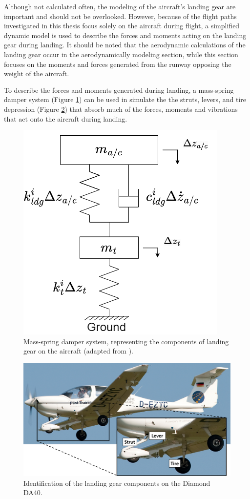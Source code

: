 \documentclass[../chapter_2.tex]{subfiles}
\begin{document}
Although not calculated often, the modeling of the aircraft's landing gear are important and should not be overlooked. However, because of the flight paths investigated in this thesis focus solely on the aircraft during flight, a simplified dynamic model is used to describe the forces and moments acting on the landing gear during landing. It should be noted that the aerodynamic calculations of the landing gear occur in the aerodynamically modeling section, while this section focuses on the moments and forces generated from the runway opposing the weight of the aircraft.

To describe the forces and moments generated during landing, a mass-spring damper system (Figure \ref{fig:ldgfbd}) can be used in simulate the the struts, levers, and tire depression (Figure \ref{fig:ldg}) that absorb much of the forces, moments and vibrations that act onto the aircraft during landing.

\begin{figure}[!h]
        \centering
    \includegraphics[width=.4\linewidth]{../../Figures/ldgfbd.drawio.png}
    \caption{Mass-spring damper system, representing the components of landing gear on the aircraft (adapted from \cite{xingStrengthAnalysisDiagonal2012}).}
    \label{fig:ldgfbd}
\end{figure}

\begin{figure}[!h]
        \centering
    \includegraphics[width=.75\linewidth]{../../Figures/LandingGear.png}
    \caption{Identification of the landing gear components on the Diamond DA40.}
    \label{fig:ldg}
\end{figure}
\end{document}
